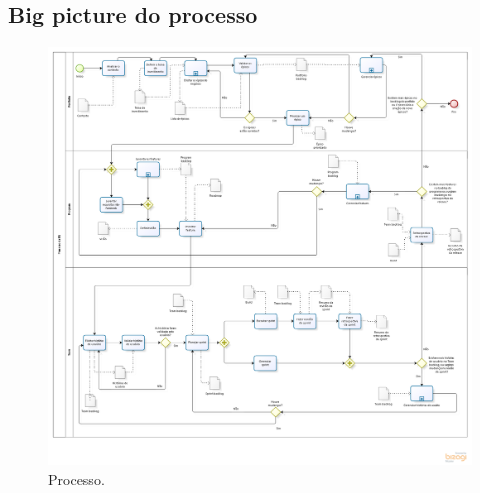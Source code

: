 \begin{anexosenv}
\partanexos
\chapter{Big picture do processo}
 \begin{figure}[!htbp]
    \centering
    \includegraphics[scale=0.35]{figuras/Processo_v1-2}
    \caption[Big picture do processo.]{Processo. \footnotemark}
    \label{processo}
  \end{figure}

\end{anexosenv}


